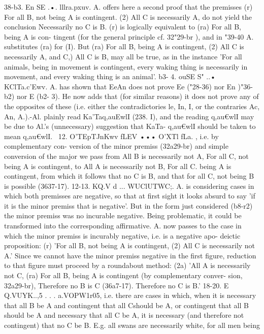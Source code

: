 {{{{{{{{{38-b3. En SE .•. lllra.pxuv. A. offers here a second proof that
the premisses (r) For all B, not being A is contingent. (2) All C
is necessarily A, do not yield the conclusion Necessarily no C is
B. (r) is logically equivalent to (ra) For all B, being A is con-
tingent (for the general principle cf. 32"29-br ), and in "39-40 A.
substitutes (ra) for (I). But (ra) For all B, being A is contingent,
(2) All C is necessarily A, and C,) All C is B, may all be true, as
in the instance 'For all animals, being in movement is contingent,
every waking thing is necessarily in movement, and every waking
thing is an animal'.
b3- 4. ouSE S" ..• KClTa.c'Ewv. A. has shown that EeAn does
not prove Ee ("28-36) nor En )"36-b2) nor E (b2- 3). He now adds
that (for similar reasons) it does not prove any of the opposites
of these (i.e. either the contradictories le, In, I, or the contraries
Ac, An, A.).-Al. plainly read Ka'Taq,auEwlI (238. I), and the reading
q,au€wlI may be due to Al.'s (unnecessary) suggestion that KaTa-
q,au€wlI should be taken to mean q,au€wlI.
~12. O'TEpTJnKwv fLEV ••• O'XTl fLa. , i.e. by complementary con-
version of the minor premiss (32a29-br) and simple conversion of
the major we pass from All B is necessarily not A, For all C, not
being A is contingent, to All A is necessarily not B, For all C.
being A is contingent, from which it follows that no C is B, and
that for all C, not being B is possible (3637-17).
12-13. KQ.V d ... WUClUTWC;. A. is considering cases in which
both premisses are negative, so that at first sight it looks absurd
to say 'if it is the minor premiss that is negative'. But in the form
just considered (b8-r2) the minor premiss was no incurable
negative. Being problematic, it could be transformed into the
corresponding affirmative. A. now passes to the case in which
the minor premiss is incurably negative, i.e. is a negative apo-
deictic proposition: (r) 'For all B, not being A is contingent,
(2) All C is necessarily not A.' Since we cannot have the minor
premiss negative in the first figure, reduction to that figure must
proceed by a roundabout method: (2a) 'All A is necessarily not C,
(ra) For all B, being A is contingent (by complementary conver-
sion, 32a29-br), Therefore no B is C (36a7-17). Therefore no C is B.'
18-20. E~ Q.VUYK..,5 . . . a.VOPW1r05, i.e. there are cases in which,
when it is necessary that all B be A and contingent that all Cshould be A, or contingent that all B should be A and necessary
that all C be A, it is necessary (and therefore not contingent) that
no C be B. E.g. all swans are necessarily white, for all men being
}}}}}}}}}
